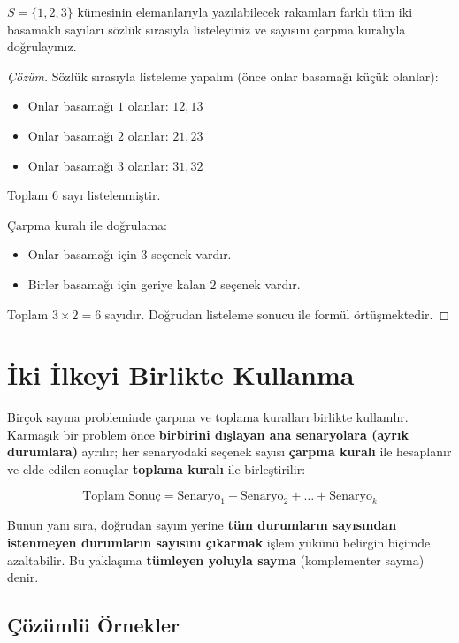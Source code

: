 \begin{example}
$S = \{1, 2, 3\}$ kümesinin elemanlarıyla yazılabilecek rakamları farklı tüm iki basamaklı sayıları sözlük sırasıyla listeleyiniz ve sayısını çarpma kuralıyla doğrulayınız.
\end{example}
\begin{proof}[Çözüm]
Sözlük sırasıyla listeleme yapalım (önce onlar basamağı küçük olanlar):
\begin{itemize}
  \item Onlar basamağı $1$ olanlar: $12, 13$
  \item Onlar basamağı $2$ olanlar: $21, 23$
  \item Onlar basamağı $3$ olanlar: $31, 32$
\end{itemize}
Toplam $6$ sayı listelenmiştir.

Çarpma kuralı ile doğrulama:
\begin{itemize}
  \item Onlar basamağı için $3$ seçenek vardır.
  \item Birler basamağı için geriye kalan $2$ seçenek vardır.
\end{itemize}
Toplam $3 \times 2 = 6$ sayıdır. Doğrudan listeleme sonucu ile formül örtüşmektedir.
\end{proof}


\section{İki İlkeyi Birlikte Kullanma}

Birçok sayma probleminde çarpma ve toplama kuralları birlikte kullanılır. Karmaşık bir problem önce \textbf{birbirini dışlayan ana senaryolara (ayrık durumlara)} ayrılır; her senaryodaki seçenek sayısı \textbf{çarpma kuralı} ile hesaplanır ve elde edilen sonuçlar \textbf{toplama kuralı} ile birleştirilir:

\[ \text{Toplam Sonuç} = \text{Senaryo}_1 + \text{Senaryo}_2 + \dots + \text{Senaryo}_k \]

Bunun yanı sıra, doğrudan sayım yerine \textbf{tüm durumların sayısından istenmeyen durumların sayısını çıkarmak} işlem yükünü belirgin biçimde azaltabilir. Bu yaklaşıma \textbf{tümleyen yoluyla sayma} (komplementer sayma) denir.

\subsection{Çözümlü Örnekler}

